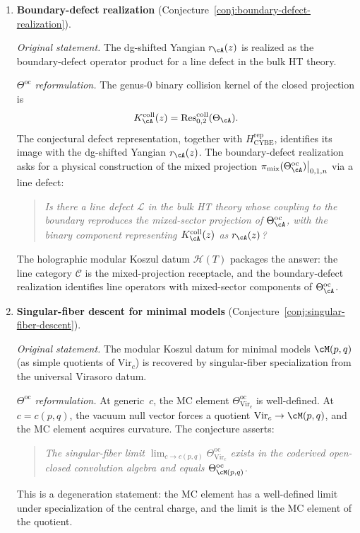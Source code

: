 \begin{enumerate}[resume, label=\textup{(\arabic*)}]
\item \textbf{Boundary-defect realization}
 (Conjecture~\ref{conj:boundary-defect-realization}).

 \smallskip\noindent
 \emph{Original statement.}
 The dg-shifted Yangian $r_\cA(z)$ is realized as the
 boundary-defect operator product for a line defect in the
 bulk HT theory.

 \smallskip\noindent
 \emph{$\Theta^{\mathrm{oc}}$ reformulation.}
 The genus-$0$ binary collision kernel of the closed projection is
 \[
 K_\cA^{\mathrm{coll}}(z)
 =\operatorname{Res}^{\mathrm{coll}}_{0,2}(\Theta_\cA).
 \]
 The conjectural defect representation, together with
 $H_{\mathrm{CYBE}}^{\mathrm{rep}}$, identifies its image with the
 dg-shifted Yangian $r_\cA(z)$.
 The boundary-defect realization asks for a physical construction
 of the mixed projection
 $\pi_{\mathrm{mix}}(\Theta^{\mathrm{oc}}_\cA)\big|_{0,1,n}$
 via a line defect:
 \begin{quote}
 \emph{Is there a line defect $\mathcal{L}$ in the bulk HT theory
 whose coupling to the boundary reproduces the mixed-sector
 projection of $\Theta^{\mathrm{oc}}_\cA$, with the binary
 component representing $K_\cA^{\mathrm{coll}}(z)$ as
 $r_\cA(z)$?}
 \end{quote}
 The holographic modular Koszul datum
 $\mathcal{H}(T)$ packages the answer: the line category
 $\mathcal{C}$ is the mixed-projection receptacle, and the
 boundary-defect realization identifies line operators with
 mixed-sector components of $\Theta^{\mathrm{oc}}_\cA$.

\item \textbf{Singular-fiber descent for minimal models}
 (Conjecture~\ref{conj:singular-fiber-descent}).

 \smallskip\noindent
 \emph{Original statement.}
 The modular Koszul datum for minimal models $\cM(p,q)$
 (as simple quotients of $\mathrm{Vir}_c$) is recovered by
 singular-fiber specialization from the universal Virasoro datum.

 \smallskip\noindent
 \emph{$\Theta^{\mathrm{oc}}$ reformulation.}
 At generic~$c$, the MC element $\Theta^{\mathrm{oc}}_{\mathrm{Vir}_c}$
 is well-defined. At $c = c(p,q)$, the vacuum null vector
 forces a quotient $\mathrm{Vir}_c \to \cM(p,q)$, and the MC
 element acquires curvature. The conjecture asserts:
 \begin{quote}
 \emph{The singular-fiber limit
 $\lim_{c \to c(p,q)} \Theta^{\mathrm{oc}}_{\mathrm{Vir}_c}$
 exists in the coderived open-closed convolution algebra and
 equals $\Theta^{\mathrm{oc}}_{\cM(p,q)}$.}
 \end{quote}
 This is a degeneration statement: the MC element has a
 well-defined limit under specialization of the central charge,
 and the limit is the MC element of the quotient.

\end{enumerate}

